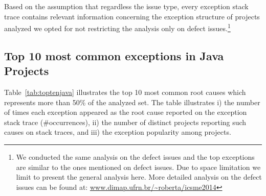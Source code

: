 \documentclass[conference]{IEEEtran}
\begin{document}



Based on the assumption that regardless the issue type, every exception stack
trace contains relevant information concerning the exception structure of
projects analyzed we opted for not restricting the analysis only on defect
issues.\footnote{We conducted the same analysis on the defect issues and the top
exceptions are similar to the ones mentioned on defect issues. Due to space
limitation we limit to present the general analysis here. More detailed analysis
on the defect issues can be found at:
\url{www.dimap.ufrn.br/~roberta/icsme2014}}

\subsection{Top 10 most common exceptions in Java Projects}

Table~\ref{tab:toptenjava} illustrates the top 10 most common root causes which
represents more than 50\% of the analyzed set. The table illustrates  i) the
number of times each exception appeared as the root cause reported on the exception stack trace
(\#occurrences), ii) the number of distinct projects reporting such causes on
stack traces, and iii) the exception popularity among projects.
\end{document}
